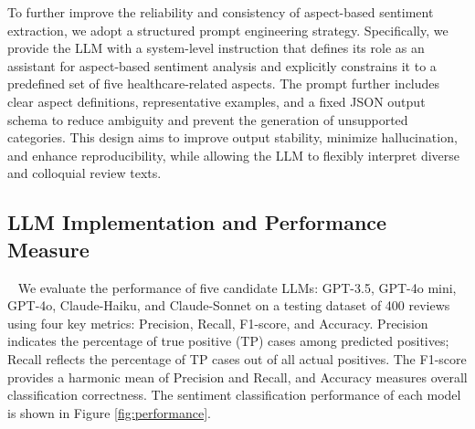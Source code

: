 \documentclass[journal,twoside,web]{ieeecolor}
\begin{document}
To further improve the reliability and consistency of aspect-based sentiment extraction, we adopt a structured prompt engineering strategy. Specifically, we provide the LLM with a system-level instruction that defines its role as an assistant for aspect-based sentiment analysis and explicitly constrains it to a predefined set of five healthcare-related aspects. The prompt further includes clear aspect definitions, representative examples, and a fixed JSON output schema to reduce ambiguity and prevent the generation of unsupported categories. This design aims to improve output stability, minimize hallucination, and enhance reproducibility, while allowing the LLM to flexibly interpret diverse and colloquial review texts.

\subsection{LLM Implementation and Performance Measure} 
We evaluate the performance of five candidate LLMs: GPT-3.5, GPT-4o mini, GPT-4o, Claude-Haiku, and Claude-Sonnet on a testing dataset of 400 reviews using four key metrics: Precision, Recall, F1-score, and Accuracy. Precision indicates the percentage of true positive (TP) cases among predicted positives; Recall reflects the percentage of TP cases out of all actual positives. The F1-score provides a harmonic mean of Precision and Recall, and Accuracy measures overall classification correctness. The sentiment classification performance of each model is shown in Figure \ref{fig:performance}.  
\end{document}
